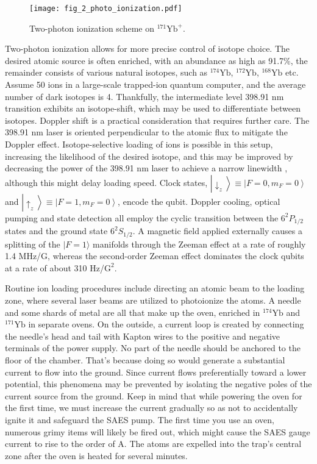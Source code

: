 \begin{figure}
    \centering
    \texttt{[image: fig\_2\_photo\_ionization.pdf]}
    \caption{Two-photon ionization scheme on ${ }^{171} \mathrm{Yb}^{+}$.}
    \label{fig:photo_ionization}
\end{figure}

Two-photon ionization allows for more precise control of isotope choice. The desired atomic source is often enriched, with an abundance as high as 91.7\%, the remainder consists of various natural isotopes, such as ${ }^{174} \mathrm{Yb}$, ${ }^{172} \mathrm{Yb}$, ${ }^{168} \mathrm{Yb}$ etc. Assume 50 ions in a large-scale trapped-ion quantum computer, and the average number of dark isotopes is 4. Thankfully, the intermediate level 398.91 nm transition exhibits an isotope-shift, which may be used to differentiate between isotopes. Doppler shift is a practical consideration that requires further care. The 398.91 nm laser is oriented perpendicular to the atomic flux to mitigate the Doppler effect. Isotope-selective loading of ions is possible in this setup, increasing the likelihood of the desired isotope, and this may be improved by decreasing the power of the 398.91 nm laser to achieve a narrow linewidth , although this might delay loading speed. Clock states, $\left|\downarrow_z\right\rangle \equiv\left|F=0, m_F=0\right\rangle$ and $\left|\uparrow_z\right\rangle \equiv\left|F=1, m_F=0\right\rangle$, encode the qubit. Doppler cooling, optical pumping and state detection all employ the cyclic transition between the $6^2 P_{1 / 2}$ states and the ground state $6^2 S_{1 / 2}$. A magnetic field applied externally causes a splitting of the $|F=1\rangle$ manifolds through the Zeeman effect at a rate of roughly 1.4 MHz/G, whereas the second-order Zeeman effect dominates the clock qubits at a rate of about 310 Hz/$\mathrm{G}^2$.

Routine ion loading procedures include directing an atomic beam to the loading zone, where several laser beams are utilized to photoionize the atoms. A needle and some shards of metal are all that make up the oven, enriched in ${ }^{174} \mathrm{Yb}$ and ${ }^{171} \mathrm{Yb}$ in separate ovens. On the outside, a current loop is created by connecting the needle's head and tail with Kapton wires to the positive and negative terminals of the power supply. No part of the needle should be anchored to the floor of the chamber. That's because doing so would generate a substantial current to flow into the ground. Since current flows preferentially toward a lower potential, this phenomena may be prevented by isolating the negative poles of the current source from the ground. Keep in mind that while powering the oven for the first time, we must increase the current gradually so as not to accidentally ignite it and safeguard the SAES pump. The first time you use an oven, numerous grimy items will likely be fired out, which might cause the SAES gauge current to rise to the order of A. The atoms are expelled into the trap's central zone after the oven is heated for several minutes.

